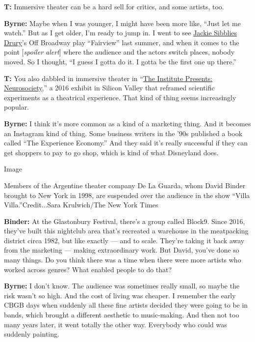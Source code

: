\textbf{T:} Immersive theater can be a hard sell for critics, and some
artists, too.

\textbf{Byrne:} Maybe when I was younger, I might have been more like,
``Just let me watch.'' But as I get older, I'm ready to jump in. I went
to see
\href{https://www.nytimes3xbfgragh.onion/interactive/2019/04/10/t-magazine/jackie-sibblies-drury-play.html}{Jackie
Sibblies Drury}'s Off Broadway play ``Fairview'' last summer, and when
it comes to the point {[}\emph{spoiler alert}{]} where the audience and
the actors switch places, nobody moved. So I thought, ``I guess I gotta
do it. I gotta be the first one up there.''

\textbf{T:} You also dabbled in immersive theater in
``\href{https://www.nytimes3xbfgragh.onion/2016/10/04/arts/next-from-david-byrne-neuroscience-in-an-art-gallery.html}{The
Institute Presents: Neurosociety},'' a 2016 exhibit in Silicon Valley
that reframed scientific experiments as a theatrical experience. That
kind of thing seems increasingly popular.

\textbf{Byrne:} I think it's more common as a kind of a marketing thing.
And it becomes an Instagram kind of thing. Some business writers in the
'90s published a book called ``The Experience Economy.'' And they said
it's really successful if they can get shoppers to pay to go shop, which
is kind of what Disneyland does.

Image

Members of the Argentine theater company De La Guarda, whom David Binder
brought to New York in 1998, are suspended over the audience in the show
``Villa Villa.''Credit...Sara Krulwich/The New York Times

\textbf{Binder:} At the Glastonbury Festival, there's a group called
Block9. Since 2016, they've built this nightclub area that's recreated a
warehouse in the meatpacking district circa 1982, but like exactly ---
and to scale. They're taking it back away from the marketing --- making
extraordinary work. But David, you've done so many things. Do you think
there was a time when there were more artists who worked across genres?
What enabled people to do that?

\textbf{Byrne:} I don't know. The audience was sometimes really small,
so maybe the risk wasn't so high. And the cost of living was cheaper. I
remember the early CBGB days when suddenly all these fine artists
decided they were going to be in bands, which brought a different
aesthetic to music-making. And then not too many years later, it went
totally the other way. Everybody who could was suddenly painting.

